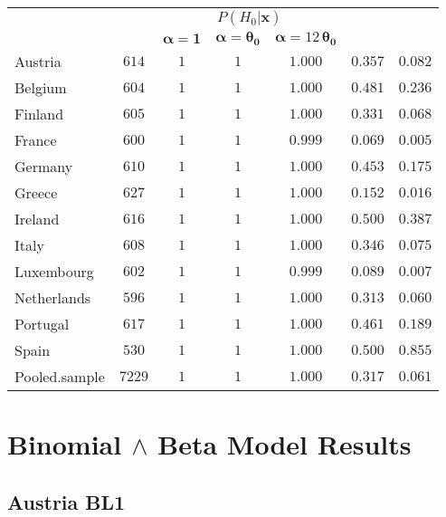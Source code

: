 \documentclass[12pt,a4paper,draft]{article}
\begin{document}
\begin{table}[H] 
\begin{center}
\begin{tabular}{|l|c|c|c|c|c|c|}

\hline
\multicolumn{1}{|c|}{{\multirow{2}{*}{Country}}} &  \multicolumn{1}{c|}{{\multirow{2}{*}{$N$}}} & \multicolumn{3}{c|}{$P(H_0| \bm{x})$} &  \multicolumn{1}{c|}{{\multirow{2}{*}{${\underline{P}}{(H_0|\bm{x})}$}}} & \multicolumn{1}{c|}{{\multirow{2}{*}{${p_{\text{{obs}}}}$}}}\tabularnewline
 \cline{3-5}  
  &  & \multicolumn{1}{c|}{$\bm{\alpha} =\bm{1}$}  &  \multicolumn{1}{c|}{$\bm{\alpha} =\bm{\theta_0}$}  &  \multicolumn{1}{c|}{$\bm{\alpha}=12 \, \bm{\theta_0}$}  &  & \\
\hline

Austria&$ 614$&$1$&$1$&$1.000$&$0.357$&$0.082$\tabularnewline
Belgium&$ 604$&$1$&$1$&$1.000$&$0.481$&$0.236$\tabularnewline
Finland&$ 605$&$1$&$1$&$1.000$&$0.331$&$0.068$\tabularnewline
France&$ 600$&$1$&$1$&$0.999$&$0.069$&$0.005$\tabularnewline
Germany&$ 610$&$1$&$1$&$1.000$&$0.453$&$0.175$\tabularnewline
Greece&$ 627$&$1$&$1$&$1.000$&$0.152$&$0.016$\tabularnewline
Ireland&$ 616$&$1$&$1$&$1.000$&$0.500$&$0.387$\tabularnewline
Italy&$ 608$&$1$&$1$&$1.000$&$0.346$&$0.075$\tabularnewline
Luxembourg&$ 602$&$1$&$1$&$0.999$&$0.089$&$0.007$\tabularnewline
Netherlands&$ 596$&$1$&$1$&$1.000$&$0.313$&$0.060$\tabularnewline
Portugal&$ 617$&$1$&$1$&$1.000$&$0.461$&$0.189$\tabularnewline
Spain&$ 530$&$1$&$1$&$1.000$&$0.500$&$0.855$\tabularnewline
Pooled.sample&$7229$&$1$&$1$&$1.000$&$0.317$&$0.061$\tabularnewline
\hline
\end{tabular}\end{center}
\end{table}

\section{Binomial $\land$ Beta Model Results}

\subsection{Austria BL1}
\end{document}
